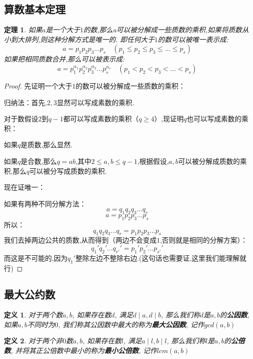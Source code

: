 \documentclass{article}
\newtheorem{theorem}{定理}
\newtheorem{definition}{定义}
\begin{document}
	\subsection{算数基本定理}
	
		\begin{theorem}
			如果$ a $是一个大于$ 1 $的数,那么a可以被分解成一些质数的乘积,如果将质数从小到大排列,则这种分解方式是唯一的. 即任何大于$ 1 $的数可以被唯一表示成: 
			$$ a = p_1p_2p_3\dots p_s \quad ( p_1 \leq p_2 \leq p_3 \leq \dots \leq p_s  )$$
			如果把相同质数合并,那么可以被表示成: 
			$$ a = p_{1}^{\alpha_1}p_{2}^{\alpha_2}p_{3}^{\alpha_3}\dots p_{s}^{\alpha_s} \quad ( p_1 < p_2 < p_3 < \dots < p_s )$$
		\end{theorem}
		\begin{proof}
			先证明一个大于$ 1 $的数可以被分解成一些质数的乘积：
			
			归纳法：首先,$ 2,3 $显然可以写成素数的乘积.
			
			对于数假设$ 2 $到$ q-1 $都可以写成素数的乘积（$q \geq 4$）,现证明$q$也可以写成素数的乘积：
			
			如果$q$是质数,那么显然.
			
			如果$q$是合数,那么$q = a b$,其中$2 \leq a,b \leq q-1$,根据假设,$ a,b $可以被分解成质数的乘积,那么$q$可以被分写成质数的乘积.
			
			现在证唯一：
			
			如果有两种不同分解方法：
			$$ a = q_1 q_2 q_3 \dots q_r $$
			$$ a = p_1 p_2 p_3 \dots p_s $$
			所以：
			$$ q_1 q_2 q_3 \dots q_r = p_1 p_2 p_3 \dots p_s $$
			我们去掉两边公共的质数,从而得到（两边不会变成$ 1 $,否则就是相同的分解方案）：
			$$  q_1 ' q_2 ' \dots q_{r'} '=  p_1 ' p_2 ' \dots  p_{s'}'$$
			而这是不可能的,因为$q_1 '$整除左边不整除右边.(这句话也需要证,这里我们能理解就行)
		\end{proof}
	
	\subsection{最大公约数}
	
	\begin{definition}
		对于两个数$a, b$, 如果存在数$d$, 满足$d \mid a, d \mid b$, 那么我们称$d$是$a,b$的\textbf{公因数}, 如果$a, b$不同时为$0$, 我们称其公因数中最大的称为\textbf{最大公因数}, 记作$gcd(a,b)$
	\end{definition}
	
	\begin{definition}
		对于两个非$0$数$a, b$, 如果存在数$l$, 满足$a \mid l, b \mid l $, 那么我们称$l$是$a,b$的\textbf{公倍数}, 并将其正公倍数中最小的称为\textbf{最小公倍数}, 记作$lcm(a,b)$
	\end{definition}
	
\end{document}
